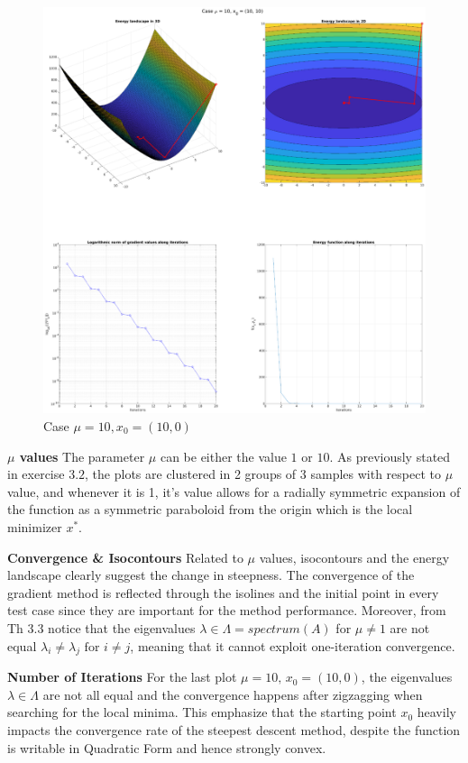 \documentclass[unicode,11pt,a4paper,oneside,numbers=endperiod,openany]{scrartcl}
\begin{document}
\begin{figure}[H]
    \centering
    \caption{Case $\mu = 10, x_0 = (10, 0)$}
    \label{fig:ex3-5-mu10-x1010}
    \includegraphics[width=\textwidth, trim={5cm 3cm 5cm 1cm}, clip]{./figures/ex3-5-mu10-x1010.eps}
\end{figure}

\textbf{$\mu$ values} \newline
The parameter $\mu$ can be either the value $1$ or $10$.
As previously stated in exercise $3.2$, the plots are clustered in 2 groups of 3 samples with respect to 
$\mu$ value, and whenever it is 1, it's value allows for a radially symmetric expansion of the function 
as a symmetric paraboloid from the origin which is the local minimizer $x^*$.
\newline

\textbf{Convergence \& Isocontours} \newline
Related to $\mu$ values, isocontours and the energy landscape clearly suggest the change in steepness.
The convergence of the gradient method is reflected through the isolines and the initial point 
in every test case since they are important for the method performance.
Moreover, from Th 3.3 notice that the eigenvalues $\lambda \in \Lambda = spectrum(A)$ for $\mu \neq 1$ are 
not equal $\lambda_i \neq \lambda_j \text{ for } i \neq j$, meaning that it cannot exploit one-iteration convergence.
\newline

\textbf{Number of Iterations} \newline
For the last plot $\mu = 10, \, x_0 = (10, 0)$, 
the eigenvalues $\lambda \in \Lambda$ are not all equal and the convergence happens after zigzagging 
when searching for the local minima.
This emphasize that the starting point $x_0$ heavily impacts the convergence rate of 
the steepest descent method,
despite the function is writable in Quadratic Form and hence strongly convex.
\end{document}
